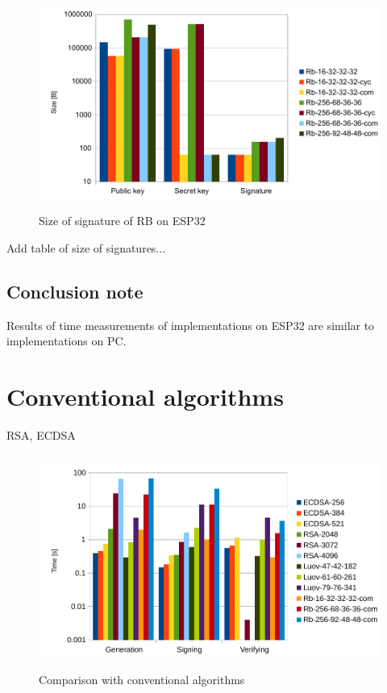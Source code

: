\documentclass[thesis=M,english]{FITthesis}[2019/12/23]
\begin{document}
\begin{figure}[H]
\centering
\includegraphics[width=13cm,height=7cm]{images/sign-rb.pdf}
\caption{Size of signature of RB on ESP32}
\label{sign-rb}
\end{figure}
Add table of size of signatures...

\subsection{Conclusion note}
Results of time measurements of implementations on ESP32 are similar to implementations on PC.

\newpage
\section{Conventional algorithms}
RSA, ECDSA

\begin{figure}[H]
\centering
\includegraphics[width=13cm,height=7cm]{images/time-all.pdf}
\caption{Comparison with conventional algorithms}
\label{time-all}
\end{figure}
\end{document}
